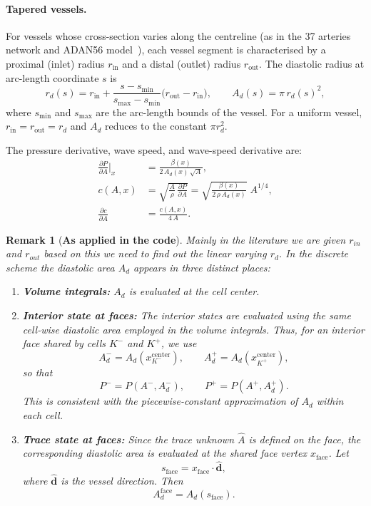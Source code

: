 \documentclass[11pt]{article}
\newtheorem{remark}[theorem]{Remark}
\begin{document}
\paragraph{Tapered vessels.}
For vessels whose cross-section varies along the centreline
(as in the 37 arteries network and ADAN56 model~\cite{alastruey2012arterial, boileau2015benchmark}),
each vessel segment is characterised by a proximal (inlet) radius
$r_{\mathrm{in}}$ and a distal (outlet) radius $r_{\mathrm{out}}$.
The diastolic radius at arc-length coordinate $s$ is
\begin{equation}
  r_d(s) = r_{\mathrm{in}}
  + \frac{s - s_{\min}}{s_{\max} - s_{\min}}
  \bigl(r_{\mathrm{out}} - r_{\mathrm{in}}\bigr),
  \qquad
  A_d(s) = \pi\,r_d(s)^2,
  \label{eq:taper}
\end{equation}
where $s_{\min}$ and $s_{\max}$ are the arc-length bounds of the
vessel.
For a uniform vessel, $r_{\mathrm{in}} = r_{\mathrm{out}} = r_d$
and $A_d$ reduces to the constant $\pi r_d^2$.

The pressure derivative, wave speed, and wave-speed derivative are:
\begin{align}
  \frac{\partial P}{\partial A}\bigg|_x
  &= \frac{\beta(x)}{2\,A_d(x)\,\sqrt{A}},
  \label{eq:dPdA}
  \\[4pt]
  c(A,x)
  &= \sqrt{\frac{A}{\rho}\,\frac{\partial P}{\partial A}}
  = \sqrt{\frac{\beta(x)}{2\,\rho\,A_d(x)}}\;A^{1/4},
  \label{eq:wave_speed}
  \\[4pt]
  \frac{\partial c}{\partial A}
  &= \frac{c(A,x)}{4\,A}.
  \label{eq:dc_dA}
\end{align}

\begin{remark}[\textbf{As applied in the code}]
Mainly in the literature we are given $r_{in}$ and $r_{out}$ based on this we need to find out the linear varying $r_d$. In the discrete scheme the diastolic area $A_d$ appears in
three distinct places:
\begin{enumerate}
\item \textbf{Volume integrals:} $A_d$ is evaluated at the cell
center.
\item \textbf{Interior state at faces:}
The interior states are evaluated using the same
cell-wise diastolic area employed in the volume
integrals. Thus, for an interior face shared by
cells $K^-$ and $K^+$, we use
\[
A_d^- = A_d(x_{K^-}^{\mathrm{center}}),
\qquad
A_d^+ = A_d(x_{K^+}^{\mathrm{center}}),
\]
so that
\[
P^- = P(A^-,A_d^-),
\qquad
P^+ = P(A^+,A_d^+).
\]
This is consistent with the piecewise-constant
approximation of $A_d$ within each cell.
\item \textbf{Trace state at faces:}
Since the trace unknown $\widehat{A}$ is defined on the
face, the corresponding diastolic area is evaluated at
the shared face vertex $x_{\mathrm{face}}$. Let
\[
s_{\mathrm{face}}
=
x_{\mathrm{face}}\cdot \widehat{\mathbf d},
\]
where $\widehat{\mathbf d}$ is the vessel direction.
Then
\[
A_d^{\mathrm{face}}
=
A_d(s_{\mathrm{face}}).
\]
\end{enumerate}
\end{remark}
\end{document}
